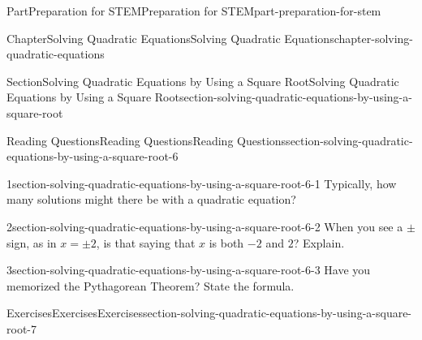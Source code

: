 \documentclass[twoside,10pt,]{book}
\numberwithin{equation}{section}
\begin{document}
\begin{partptx}{Part}{Preparation for STEM}{}{Preparation for STEM}{}{}{part-preparation-for-stem}
\begin{chapterptx}{Chapter}{Solving Quadratic Equations}{}{Solving Quadratic Equations}{}{}{chapter-solving-quadratic-equations}
\begin{sectionptx}{Section}{Solving Quadratic Equations by Using a Square Root}{}{Solving Quadratic Equations by Using a Square Root}{}{}{section-solving-quadratic-equations-by-using-a-square-root}
%
\begin{reading-questions-subsection}{Reading Questions}{Reading Questions}{}{Reading Questions}{}{}{section-solving-quadratic-equations-by-using-a-square-root-6}
\begin{divisionexercise}{1}{}{}{section-solving-quadratic-equations-by-using-a-square-root-6-1}%
Typically, how many solutions might there be with a quadratic equation?%
\end{divisionexercise}%
\begin{divisionexercise}{2}{}{}{section-solving-quadratic-equations-by-using-a-square-root-6-2}%
When you see a \(\pm\) sign, as in \(x=\pm2\), is that saying that \(x\) is both \(-2\) and \(2\)? Explain.%
\end{divisionexercise}%
\begin{divisionexercise}{3}{}{}{section-solving-quadratic-equations-by-using-a-square-root-6-3}%
Have you memorized the Pythagorean Theorem? State the formula.%
\end{divisionexercise}%
\end{reading-questions-subsection}
%
%
\typeout{************************************************}
\typeout{************************************************}
%
\begin{exercises-subsection}{Exercises}{Exercises}{}{Exercises}{}{}{section-solving-quadratic-equations-by-using-a-square-root-7}

\end{exercises-subsection}
\end{sectionptx}
\end{chapterptx}
\end{partptx}
\end{document}
